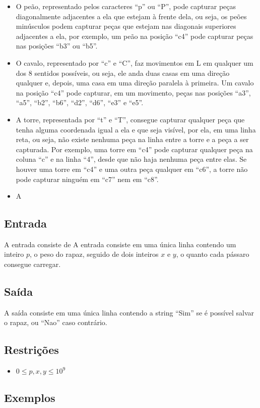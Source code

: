 \begin{itemize}
    \item O peão, representado pelos caracteres ``p'' ou ``P'', pode capturar peças diagonalmente adjacentes a ela que estejam à frente dela, ou seja, os peões minúsculos podem capturar peças que estejam nas diagonais superiores adjacentes a ela, por exemplo, um peão na posição ``c4'' pode capturar peças nas posições ``b3'' ou ``b5''.
    \item O cavalo, representado por ``c'' e ``C'', faz movimentos em L em qualquer um dos 8 sentidos possíveis, ou seja, ele anda duas casas em uma direção qualquer e, depois, uma casa em uma direção paralela à primeira. Um cavalo na posição ``c4'' pode capturar, em um movimento, peças nas posições ``a3'', ``a5'', ``b2'', ``b6'', ``d2'', ``d6'', ``e3'' e ``e5''.
    \item A torre, representada por ``t'' e ``T'', consegue capturar qualquer peça que tenha alguma coordenada igual a ela e que seja visível, por ela, em uma linha reta, ou seja, não existe nenhuma peça na linha entre a torre e a peça a ser capturada. Por exemplo, uma torre em ``c4'' pode capturar qualquer peça na coluna ``c'' e na linha ``4'', desde que não haja nenhuma peça entre elas. Se houver uma torre em ``c4'' e uma outra peça qualquer em ``c6'', a torre não pode capturar ninguém em ``c7'' nem em ``c8''.
    \item A 
\end{itemize}


\subsection*{Entrada}
\textoDiversasInstanciasEOF

A entrada consiste de 
A entrada consiste em uma única linha contendo um inteiro $p$, o peso do rapaz, seguido de dois inteiros $x$ e $y$, o quanto cada pássaro consegue carregar.


\subsection*{Saída}

A saída consiste em uma única linha contendo a string ``Sim'' se é possível salvar o rapaz, ou ``Nao'' caso contrário.


\subsection*{Restrições}
\begin{itemize}
  \item $0 \leq p, x, y \leq 10^9$
\end{itemize}

\subsection*{Exemplos}

